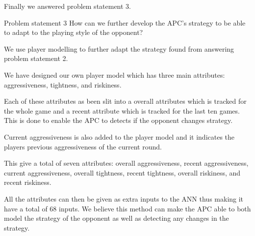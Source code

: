 Finally we answered problem statement 3.
\vspace{4mm}
\begin{statementBox2}{Problem statement 3}
How can we further develop the APC's strategy to be able to adapt to the playing style of the opponent?
\end{statementBox2}
\vspace{4mm}

We use player modelling to further adapt the strategy found from answering problem statement 2. 

We have designed our own player model which has three main attributes: aggressiveness, tightness, and riskiness.

Each of these attributes as been slit into a overall attributes which is tracked for the whole game and a recent attribute which is tracked for the last ten games. This is done to enable the APC to detects if the opponent changes strategy. 

Current aggressiveness is also added to the player model and it indicates the players previous aggressiveness of the current round.

This give a total of seven attributes: overall aggressiveness, recent aggressiveness, current aggressiveness, overall tightness, recent tightness, overall riskiness, and recent riskiness.

All the attributes can then be given as extra inputs to the ANN thus making it have a total of 68 inputs. We believe this method can make the APC able to both model the strategy of the opponent as well as detecting any changes in the strategy. 